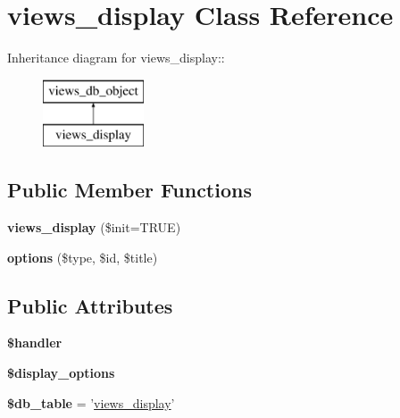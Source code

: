 \hypertarget{classviews__display}{
\section{views\_\-display Class Reference}
\label{classviews__display}
}
Inheritance diagram for views\_\-display::\begin{figure}[H]
\begin{center}
\leavevmode
\includegraphics[height=2cm]{classviews__display}
\end{center}
\end{figure}
\subsection*{Public Member Functions}
\begin{DoxyCompactItemize}
\item 
\hypertarget{classviews__display_aefb868abc8f5c4ede3d36cd2fdd21897}{
{\bfseries views\_\-display} (\$init=TRUE)}
\label{classviews__display_aefb868abc8f5c4ede3d36cd2fdd21897}

\item 
\hypertarget{classviews__display_ad88e919be5676818ccc899abfaaf370f}{
{\bfseries options} (\$type, \$id, \$title)}
\label{classviews__display_ad88e919be5676818ccc899abfaaf370f}

\end{DoxyCompactItemize}
\subsection*{Public Attributes}
\begin{DoxyCompactItemize}
\item 
\hypertarget{classviews__display_a4efeb5b11d8ea29fa711668cffab3b76}{
{\bfseries \$handler}}
\label{classviews__display_a4efeb5b11d8ea29fa711668cffab3b76}

\item 
\hypertarget{classviews__display_af8fefed58618c5397aa9cd31ef935b4d}{
{\bfseries \$display\_\-options}}
\label{classviews__display_af8fefed58618c5397aa9cd31ef935b4d}

\item 
\hypertarget{classviews__display_ae68e1e741bf5c0b633fa15b6721819f4}{
{\bfseries \$db\_\-table} = '\hyperlink{classviews__display}{views\_\-display}'}
\label{classviews__display_ae68e1e741bf5c0b633fa15b6721819f4}

\end{DoxyCompactItemize}



